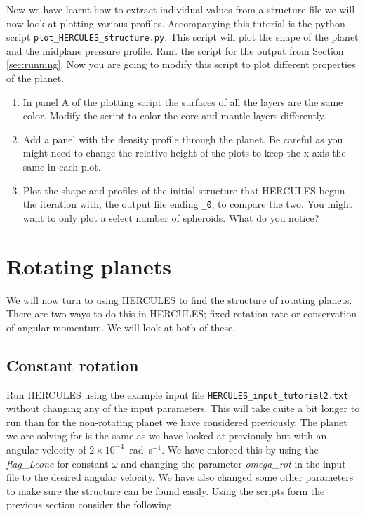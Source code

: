 \documentclass[11pt, oneside]{article}   	%
\begin{document}
Now we have learnt how to extract individual values from a structure file we will now look at plotting various profiles. Accompanying this tutorial is the python script \texttt{plot\_HERCULES\_structure.py}. This script will plot the shape of the planet and the midplane pressure profile. Runt the script for the output from Section \ref{sec:running}. Now you are going to modify this script to plot different properties of the planet.

\begin{enumerate}

\item In panel A of the plotting script the surfaces of all the layers are the same color. Modify the script to color the core and mantle layers differently.

\item Add a panel with the density profile through the planet. Be careful as you might need to change the relative height of the plots to keep the x-axis the same in each plot. 

\item Plot the shape and profiles of the initial structure that HERCULES begun the iteration with, the output file ending \texttt{\_0}, to compare the two. You might want to only plot a select number of spheroids. What do you notice?


\end{enumerate}


\section{Rotating planets}
\label{sec:rot}

We will now turn to using HERCULES to find the structure of rotating planets. There are two ways to do this in HERCULES; fixed rotation rate or conservation of angular momentum. We will look at both of these. 

\subsection{Constant rotation}

Run HERCULES using the example input file \texttt{HERCULES\_input\_tutorial2.txt} without changing any of the input parameters. This will take quite a bit longer to run than for the non-rotating planet we have considered previously. The planet we are solving for is the same as we have looked at previously but with an angular velocity of $2\times10^{-4}$~rad~s$^{-1}$. We have enforced this by using the {\it flag\_Lconc} for constant $\omega$ and changing the parameter {\it omega\_rot}  in the input file to the desired angular velocity. We have also changed some other parameters to make sure the structure can be found easily. Using the scripts form the previous section consider the following.
\end{document}
